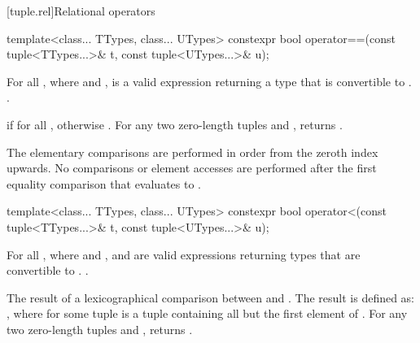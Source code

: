 [tuple.rel]{Relational operators}

%
%
\begin{itemdecl}
template<class... TTypes, class... UTypes>
  constexpr bool operator==(const tuple<TTypes...>& t, const tuple<UTypes...>& u);
\end{itemdecl}

\begin{itemdescr}
\pnum
\requires  For all ,
where  and
,  is a valid expression
returning a type that is convertible to .
 \tcode{==}
.

\pnum
\returns  {} if  for all
, otherwise .
For any two zero-length tuples  and ,  returns .

\pnum
\effects  The elementary comparisons are performed in order from the
zeroth index upwards.  No comparisons or element accesses are
performed after the first equality comparison that evaluates to
.
\end{itemdescr}

%
%
\begin{itemdecl}
template<class... TTypes, class... UTypes>
  constexpr bool operator<(const tuple<TTypes...>& t, const tuple<UTypes...>& u);
\end{itemdecl}

\begin{itemdescr}
\pnum
\requires  For all ,
where  and
, 
and 
are valid expressions returning types that are
convertible to .
 \tcode{==}
.

\pnum\returns  The result of a lexicographical comparison
between  and . The result is defined
as: , where  for some
tuple  is a tuple containing all but the first element
of .  For any two zero-length tuples 
and ,  returns .
\end{itemdescr}

